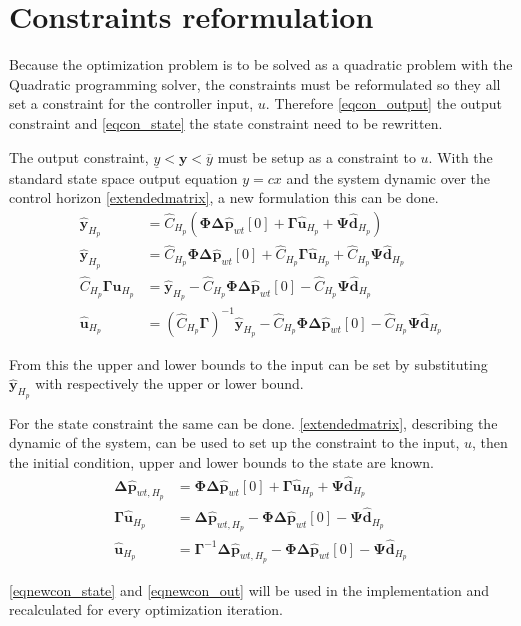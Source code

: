 
\section{Constraints reformulation}
\label{constraints_reformulation}

Because the optimization problem is to be solved as a quadratic problem with the Quadratic programming solver, the constraints must be reformulated so they all set a constraint for the controller input, $u$. Therefore \eqref{eqcon_output} the output constraint and \eqref{eqcon_state} the state constraint need to be rewritten. 

The output constraint, $\underline{y} < \bm{y} < \overline{y}$ must be setup as a constraint to $u$. With the standard state space output equation $y =c x$ and the system dynamic over the control horizon \eqref{extendedmatrix}, a new formulation this can be done.
%
\begin{align}
	\bm{\hat y}_{H_p} &= \hat C_{H_p} (\bm{\Phi} \bm{\Delta \hat{p}}_{wt}[0] + \bm{\Gamma} \bm{\hat{u}}_{H_p} + \bm{\Psi} \bm{\hat{d}}_{H_p}) \nonumber \\
% 
	\bm{\hat y}_{H_p} &= \hat C_{H_p}\bm{\Phi} \bm{\Delta \hat{p}}_{wt}[0] + \hat C_{H_p}\bm{\Gamma} \bm{\hat{u}}_{H_p} + \hat C_{H_p}\bm{\Psi} \bm{\hat{d}}_{H_p} \nonumber \\
%
	\hat C_{H_p}\bm{\Gamma} \bm{\hat{u}}_{H_p} &= \bm{\hat y}_{H_p} - \hat C_{H_p}\bm{\Phi} \bm{\Delta \hat{p}}_{wt}[0] - \hat C_{H_p}\bm{\Psi} \bm{\hat{d}}_{H_p} \nonumber \\
%
	\bm{\hat{u}}_{H_p} &= (\hat C_{H_p}\bm{\Gamma})^{-1}\bm{\hat y}_{H_p} - \hat C_{H_p}\bm{\Phi} \bm{\Delta \hat{p}}_{wt}[0] - \hat C_{H_p}\bm{\Psi} \bm{\hat{d}}_{H_p} \label{eqnewcon_out}
\end{align}

From this the upper and lower bounds to the input can be set by substituting $\bm{\hat y}_{H_p}$ with respectively the upper or lower bound.

For the state constraint the same can be done. \eqref{extendedmatrix}, describing the dynamic of the system, can be used to set up the constraint to the input, $u$, then the initial condition, upper and lower bounds to the state are known. 
%
\begin{align}
	\bm{\Delta \hat{p}}_{wt,H_p} &= \bm{\Phi} \bm{\Delta \hat{p}}_{wt}[0] + \bm{\Gamma} \bm{\hat{u}}_{H_p} + \bm{\Psi} \bm{\hat{d}}_{H_p} \nonumber \\
%
	\bm{\Gamma} \bm{\hat{u}}_{H_p} &= \bm{\Delta \hat{p}}_{wt,H_p} - \bm{\Phi} \bm{\Delta \hat{p}}_{wt}[0] - \bm{\Psi} \bm{\hat{d}}_{H_p} \nonumber \\
%
	\bm{\hat{u}}_{H_p} &= \bm{\Gamma}^{-1} \bm{\Delta \hat{p}}_{wt,H_p} - \bm{\Phi} \bm{\Delta \hat{p}}_{wt}[0] - \bm{\Psi} \bm{\hat{d}}_{H_p} \label{eqnewcon_state}
\end{align}

\eqref{eqnewcon_state} and \eqref{eqnewcon_out} will be used in the implementation and recalculated for every optimization iteration. 